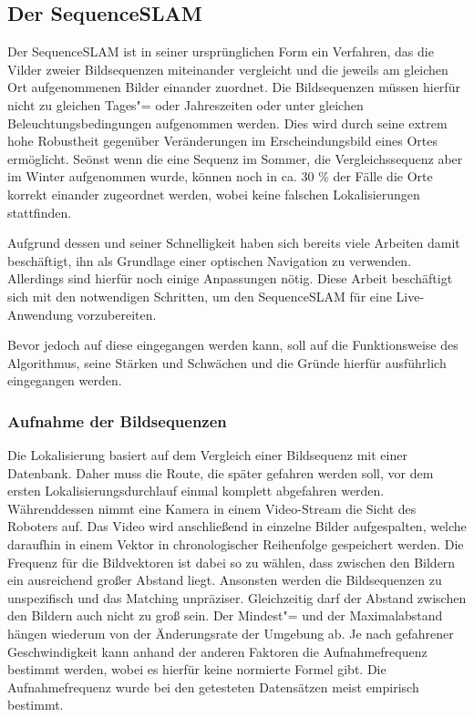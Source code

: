 \documentclass[12pt,a4paper,titlepage]{scrartcl}
\begin{document}
\subsection{Der SequenceSLAM}
Der SequenceSLAM ist in seiner ursprünglichen Form ein Verfahren, das die Vilder zweier Bildsequenzen miteinander vergleicht und die jeweils am gleichen Ort aufgenommenen Bilder einander zuordnet. Die Bildsequenzen müssen hierfür nicht zu gleichen Tages"= oder Jahreszeiten oder unter gleichen Beleuchtungsbedingungen aufgenommen werden. Dies wird durch seine extrem hohe Robustheit gegenüber Veränderungen im Erscheindungsbild eines Ortes ermöglicht. Seönst wenn die eine Sequenz im Sommer, die Vergleichssequenz aber im Winter aufgenommen wurde, können noch in ca. 30 \% der Fälle die Orte korrekt einander zugeordnet werden, wobei keine falschen Lokalisierungen stattfinden.

Aufgrund dessen und seiner Schnelligkeit haben sich bereits viele Arbeiten damit beschäftigt, ihn als Grundlage einer optischen Navigation zu verwenden. Allerdings sind hierfür noch einige Anpassungen nötig. Diese Arbeit beschäftigt sich mit den notwendigen Schritten, um den SequenceSLAM für eine Live-Anwendung vorzubereiten. 

Bevor jedoch auf diese eingegangen werden kann, soll auf die Funktionsweise des Algorithmus, seine Stärken und Schwächen und die Gründe hierfür ausführlich eingegangen werden. 
\subsubsection{Aufnahme der Bildsequenzen}
Die Lokalisierung basiert auf dem Vergleich einer Bildsequenz mit einer Datenbank. Daher muss die Route, die später gefahren werden soll, vor dem ersten Lokalisierungsdurchlauf einmal komplett abgefahren werden. Währenddessen nimmt eine Kamera in einem Video-Stream die Sicht des Roboters auf. Das Video wird anschließend in einzelne Bilder aufgespalten, welche daraufhin in einem Vektor in chronologischer Reihenfolge gespeichert werden. Die Frequenz für die Bildvektoren ist dabei so zu wählen, dass zwischen den Bildern ein ausreichend großer Abstand liegt. Ansonsten werden die Bildsequenzen zu unspezifisch und das Matching unpräziser. Gleichzeitig darf der Abstand zwischen den Bildern auch nicht zu groß sein. Der Mindest"= und der Maximalabstand hängen wiederum von der Änderungsrate der Umgebung ab. Je nach gefahrener Geschwindigkeit kann anhand der anderen Faktoren die Aufnahmefrequenz bestimmt werden, wobei es hierfür keine normierte Formel gibt. Die Aufnahmefrequenz wurde bei den getesteten Datensätzen meist empirisch bestimmt. 
\end{document}
